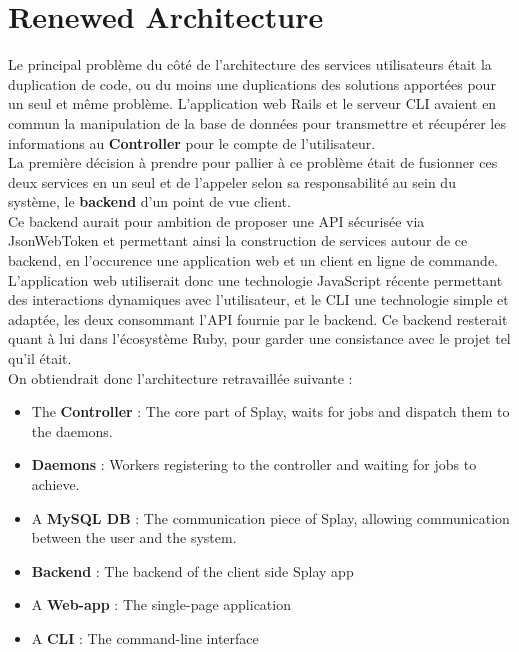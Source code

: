 \documentclass{eplmastersthesis}
\begin{document}
    \section{Renewed Architecture}

      Le principal problème du côté de l'architecture des services utilisateurs
      était la duplication de code, ou du moins une duplications des solutions
      apportées pour un seul et même problème. L'application web Rails et le
      serveur CLI avaient en commun la manipulation de la base de données pour
      transmettre et récupérer les informations au \textbf{Controller} pour
      le compte de l'utilisateur.\\

      La première décision à prendre pour pallier à ce problème était de
      fusionner ces deux services en un seul et de l'appeler selon sa responsabilité
      au sein du système, le \textbf{backend} d'un point de vue client.\\
      Ce backend aurait pour ambition de proposer une API sécurisée via
      JsonWebToken et permettant ainsi la construction de services autour de
      ce backend, en l'occurence une application web et un client en ligne
      de commande.\\

      L'application web utiliserait donc une technologie JavaScript récente
      permettant des interactions dynamiques avec l'utilisateur, et le CLI
      une technologie simple et adaptée, les deux consommant l'API fournie
      par le backend. Ce backend resterait quant à lui dans l'écosystème Ruby,
      pour garder une consistance avec le projet tel qu'il était.\\

      On obtiendrait donc l'architecture retravaillée suivante :

      \begin{itemize}
        \item The \textbf{Controller} : The core part of Splay, waits for jobs
        and dispatch them to the daemons.
        \item \textbf{Daemons} : Workers registering to the controller and waiting
        for jobs to achieve.
        \item A \textbf{MySQL DB} : The communication piece of Splay, allowing
        communication between the user and the system.
        \item \textbf{Backend} : The backend of the client side Splay app
        \item A \textbf{Web-app} : The single-page application
        \item A \textbf{CLI} : The command-line interface
      \end{itemize}
\end{document}
